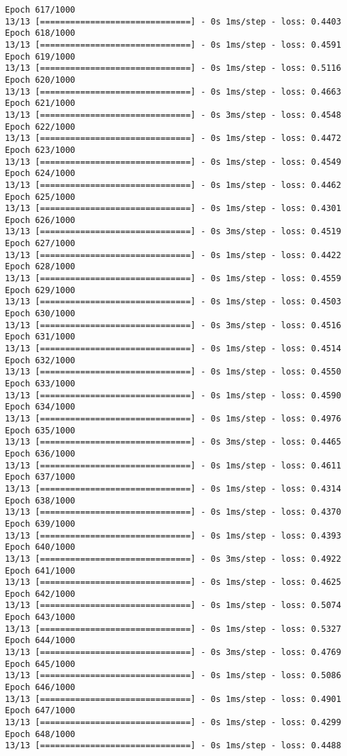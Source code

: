 \documentclass[11pt]{article}
\begin{document}
\begin{Verbatim}[commandchars=\\\{\}]
Epoch 617/1000
13/13 [==============================] - 0s 1ms/step - loss: 0.4403
Epoch 618/1000
13/13 [==============================] - 0s 1ms/step - loss: 0.4591
Epoch 619/1000
13/13 [==============================] - 0s 1ms/step - loss: 0.5116
Epoch 620/1000
13/13 [==============================] - 0s 1ms/step - loss: 0.4663
Epoch 621/1000
13/13 [==============================] - 0s 3ms/step - loss: 0.4548
Epoch 622/1000
13/13 [==============================] - 0s 1ms/step - loss: 0.4472
Epoch 623/1000
13/13 [==============================] - 0s 1ms/step - loss: 0.4549
Epoch 624/1000
13/13 [==============================] - 0s 1ms/step - loss: 0.4462
Epoch 625/1000
13/13 [==============================] - 0s 1ms/step - loss: 0.4301
Epoch 626/1000
13/13 [==============================] - 0s 3ms/step - loss: 0.4519
Epoch 627/1000
13/13 [==============================] - 0s 1ms/step - loss: 0.4422
Epoch 628/1000
13/13 [==============================] - 0s 1ms/step - loss: 0.4559
Epoch 629/1000
13/13 [==============================] - 0s 1ms/step - loss: 0.4503
Epoch 630/1000
13/13 [==============================] - 0s 3ms/step - loss: 0.4516
Epoch 631/1000
13/13 [==============================] - 0s 1ms/step - loss: 0.4514
Epoch 632/1000
13/13 [==============================] - 0s 1ms/step - loss: 0.4550
Epoch 633/1000
13/13 [==============================] - 0s 1ms/step - loss: 0.4590
Epoch 634/1000
13/13 [==============================] - 0s 1ms/step - loss: 0.4976
Epoch 635/1000
13/13 [==============================] - 0s 3ms/step - loss: 0.4465
Epoch 636/1000
13/13 [==============================] - 0s 1ms/step - loss: 0.4611
Epoch 637/1000
13/13 [==============================] - 0s 1ms/step - loss: 0.4314
Epoch 638/1000
13/13 [==============================] - 0s 1ms/step - loss: 0.4370
Epoch 639/1000
13/13 [==============================] - 0s 1ms/step - loss: 0.4393
Epoch 640/1000
13/13 [==============================] - 0s 3ms/step - loss: 0.4922
Epoch 641/1000
13/13 [==============================] - 0s 1ms/step - loss: 0.4625
Epoch 642/1000
13/13 [==============================] - 0s 1ms/step - loss: 0.5074
Epoch 643/1000
13/13 [==============================] - 0s 1ms/step - loss: 0.5327
Epoch 644/1000
13/13 [==============================] - 0s 3ms/step - loss: 0.4769
Epoch 645/1000
13/13 [==============================] - 0s 1ms/step - loss: 0.5086
Epoch 646/1000
13/13 [==============================] - 0s 1ms/step - loss: 0.4901
Epoch 647/1000
13/13 [==============================] - 0s 1ms/step - loss: 0.4299
Epoch 648/1000
13/13 [==============================] - 0s 1ms/step - loss: 0.4488

\end{Verbatim}
\end{document}
